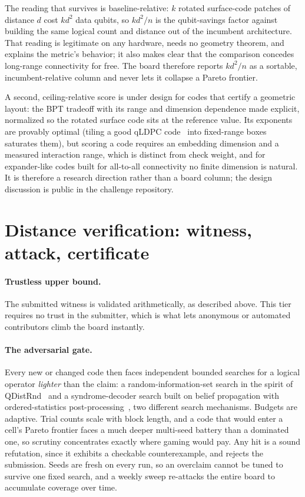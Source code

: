 \documentclass{ceurart}
\newcommand{\eff}{kd^2/n}
\begin{document}
The reading that survives is baseline-relative: $k$ rotated surface-code
patches of distance $d$ cost $kd^2$ data qubits, so $\eff$ is the
qubit-savings factor against building the same logical count and distance out
of the incumbent architecture. That reading is legitimate on any hardware,
needs no geometry theorem, and explains the metric's behavior; it also makes
clear that the comparison concedes long-range connectivity for free. The
board therefore reports $\eff$ as a sortable, incumbent-relative column and
never lets it collapse a Pareto frontier.

A second, ceiling-relative score is under design for codes that certify a
geometric layout: the BPT tradeoff with its range and dimension dependence
made explicit, normalized so the rotated surface code sits at the reference
value. Its exponents are provably optimal (tiling a good qLDPC
code~\cite{panteleev2022asymptotically} into fixed-range boxes saturates
them), but scoring a code requires an embedding dimension and a measured
interaction range, which is distinct from check weight, and for expander-like
codes built for all-to-all connectivity no finite dimension is natural. It is
therefore a research direction rather than a board column; the design
discussion is public in the challenge repository.

\section{Distance verification: witness, attack, certificate}
\label{sec:distance}

\paragraph{Trustless upper bound.} The submitted witness is validated
arithmetically, as described above. This tier requires no trust in the
submitter, which is what lets anonymous or automated contributors climb the
board instantly.

\paragraph{The adversarial gate.} Every new or changed code then faces
independent bounded searches for a logical operator \emph{lighter} than the
claim: a random-information-set search in the spirit of
QDistRnd~\cite{pryadko2023qdistrnd} and a syndrome-decoder search built on
belief propagation with ordered-statistics
post-processing~\cite{roffe2020decoding}, two different search mechanisms.
Budgets are adaptive. Trial counts scale with block length, and a code that
would enter a cell's Pareto frontier faces a much deeper multi-seed battery
than a dominated one, so scrutiny concentrates exactly where gaming would
pay. Any hit is a sound refutation, since it exhibits a checkable
counterexample, and rejects the submission. Seeds are fresh on every run, so
an overclaim cannot be tuned to survive one fixed search, and a weekly sweep
re-attacks the entire board to accumulate coverage over time.
\end{document}
